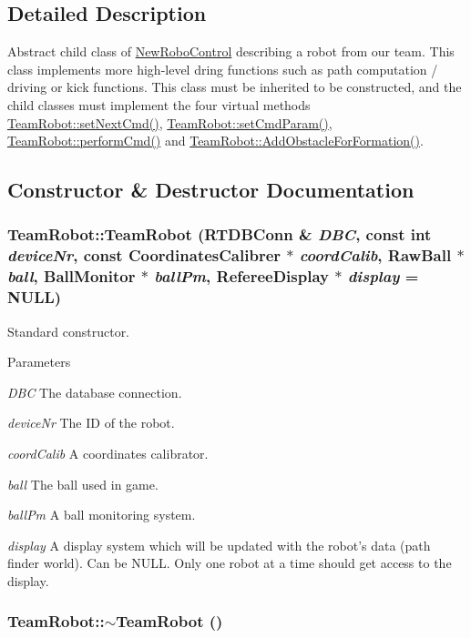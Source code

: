 \subsection{Detailed Description}
Abstract child class of \hyperlink{classNewRoboControl}{NewRoboControl} describing a robot from our team. This class implements more high-\/level dring functions such as path computation / driving or kick functions. This class must be inherited to be constructed, and the child classes must implement the four virtual methods \hyperlink{classTeamRobot_a65f9a2b7464dfac3f4a0336810cf574f}{TeamRobot::setNextCmd()}, \hyperlink{classTeamRobot_a34c0fd6986c510d4025e5752b3c0e49a}{TeamRobot::setCmdParam()}, \hyperlink{classTeamRobot_a9b84df51ca16a7203fdb6498ea6741da}{TeamRobot::performCmd()} and \hyperlink{classTeamRobot_a71ec65db46db1ac511fe17b668d4f192}{TeamRobot::AddObstacleForFormation()}. 

\subsection{Constructor \& Destructor Documentation}
\hypertarget{classTeamRobot_a4b116f58f0a1568a886d03b0c71df20c}{
\subsubsection[{TeamRobot}]{\setlength{\rightskip}{0pt plus 5cm}TeamRobot::TeamRobot (RTDBConn \& {\em DBC}, \/  const int {\em deviceNr}, \/  const {\bf CoordinatesCalibrer} $\ast$ {\em coordCalib}, \/  RawBall $\ast$ {\em ball}, \/  {\bf BallMonitor} $\ast$ {\em ballPm}, \/  {\bf RefereeDisplay} $\ast$ {\em display} = {\ttfamily NULL})}}
\label{classTeamRobot_a4b116f58f0a1568a886d03b0c71df20c}


Standard constructor. 


\begin{DoxyParams}{Parameters}
\item[{\em DBC}]The database connection. \item[{\em deviceNr}]The ID of the robot. \item[{\em coordCalib}]A coordinates calibrator. \item[{\em ball}]The ball used in game. \item[{\em ballPm}]A ball monitoring system. \item[{\em display}]A display system which will be updated with the robot's data (path finder world). Can be NULL. Only one robot at a time should get access to the display. \end{DoxyParams}
\hypertarget{classTeamRobot_a7be9d5161b7524cbbb6ae486ad4a1b42}{
\subsubsection[{$\sim$TeamRobot}]{\setlength{\rightskip}{0pt plus 5cm}TeamRobot::$\sim$TeamRobot ()}}
\label{classTeamRobot_a7be9d5161b7524cbbb6ae486ad4a1b42}


